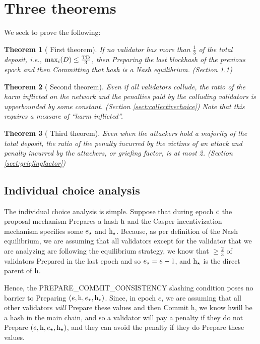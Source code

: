 \documentclass[12pt, final]{article}
\newcommand*{\todo}[1]{\color{red} #1}
\newtheorem{theorem}{Theorem}
\newcommand{\epoch}{\ensuremath{e}\space}
\newcommand{\hash}{\textnormal{h}\space}
\newcommand{\epochsource}{\ensuremath{\epoch_{\star}}\space}
\newcommand{\hashsource}{\ensuremath{\hash_{\star}}\space}
\newcommand{\totaldeposit}{\textnormal{TD}\space}
\begin{document}
\section{Three theorems}

We seek to prove the following:

\begin{theorem}[\todo{First theorem}]
\label{theorem1}
If no validator has more than $\frac{1}{3}$ of the total deposit, i.e., $\max_i(D) \leq \frac{\totaldeposit}{3}$, then Preparing the last blockhash of the previous epoch and then Committing that hash is a Nash equilibrium. (Section \ref{sect:indivchoice})
\end{theorem}

\begin{theorem}[\todo{Second theorem}]
\label{theorem2}
Even if all validators collude, the ratio of the harm inflicted on the network and the penalties paid by the colluding validators is upperbounded  by some constant. (Section \ref{sect:collectivechoice})  Note that this requires a measure of ``harm inflicted''.
\end{theorem}

\begin{theorem}[\todo{Third theorem}]
\label{theorem3}
Even when the attackers hold a majority of the total deposit, the ratio of the penalty incurred by the victims of an attack and penalty incurred by the attackers, or \emph{griefing factor}, is at most 2. (Section \ref{sect:griefingfactor})
\end{theorem}

\subsection{Individual choice analysis}
\label{sect:indivchoice}

The individual choice analysis is simple. Suppose that during epoch $\epoch$ the proposal mechanism Prepares a hash $\hash$ and the Casper incentivization mechanism specifies some $\epochsource$ and $\hashsource$. Because, as per definition of the Nash equilibrium, we are assuming that all validators except for the validator that we are analyzing are following the equilibrium strategy, we know that $\ge \frac{2}{3}$ of validators Prepared in the last epoch and so $\epochsource = \epoch - 1$, and $\hashsource$ is the direct parent of $\hash$.

Hence, the PREPARE\_COMMIT\_CONSISTENCY slashing condition poses no barrier to Preparing $(\epoch, \hash, \epochsource, \hashsource)$. Since, in epoch \epoch, we are assuming that all other validators \emph{will} Prepare these values and then Commit \hash, we know \hash will be a hash in the main chain, and so a validator will pay a penalty if they do not Prepare $(\epoch, \hash, \epochsource, \hashsource)$, and they can avoid the penalty if they do Prepare these values.
\end{document}
